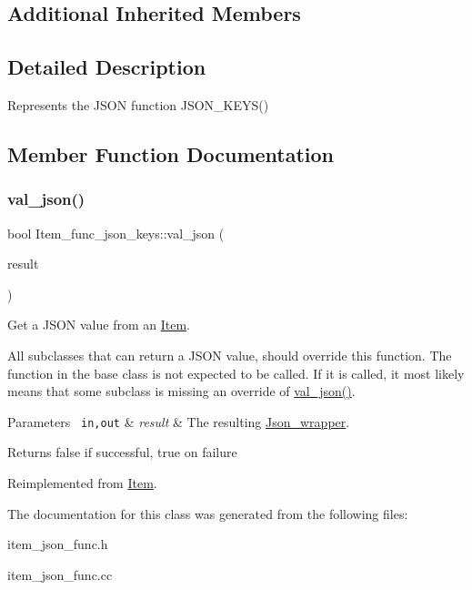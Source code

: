 \subsection*{Additional Inherited Members}


\subsection{Detailed Description}
Represents the J\+S\+ON function J\+S\+O\+N\+\_\+\+K\+E\+Y\+S() 

\subsection{Member Function Documentation}
\mbox{\label{classItem__func__json__keys_aef4e835bbd9ef49b650477f220373ee4}} 
\subsubsection{\texorpdfstring{val\+\_\+json()}{val\_json()}}
{\footnotesize\ttfamily bool Item\+\_\+func\+\_\+json\+\_\+keys\+::val\+\_\+json (\begin{DoxyParamCaption}\item[{\mbox{\hyperlink{classJson__wrapper}{Json\+\_\+wrapper}} $\ast$}]{result }\end{DoxyParamCaption})\hspace{0.3cm}{\ttfamily [virtual]}}

Get a J\+S\+ON value from an \mbox{\hyperlink{classItem}{Item}}.

All subclasses that can return a J\+S\+ON value, should override this function. The function in the base class is not expected to be called. If it is called, it most likely means that some subclass is missing an override of \mbox{\hyperlink{classItem__func__json__keys_aef4e835bbd9ef49b650477f220373ee4}{val\+\_\+json()}}.


\begin{DoxyParams}[1]{Parameters}
\mbox{\texttt{ in,out}}  & {\em result} & The resulting \mbox{\hyperlink{classJson__wrapper}{Json\+\_\+wrapper}}.\\
\hline
\end{DoxyParams}
\begin{DoxyReturn}{Returns}
false if successful, true on failure 
\end{DoxyReturn}


Reimplemented from \mbox{\hyperlink{classItem_a57e763fcde2d0a819d21e31c59611290}{Item}}.



The documentation for this class was generated from the following files\+:\begin{DoxyCompactItemize}
\item 
item\+\_\+json\+\_\+func.\+h\item 
item\+\_\+json\+\_\+func.\+cc\end{DoxyCompactItemize}
